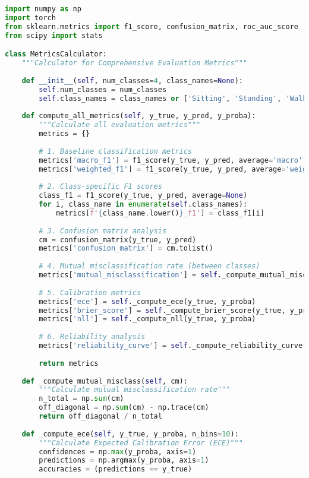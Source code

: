 \begin{lstlisting}[language=Python,caption=Implementation of Comprehensive Evaluation Metrics]
import numpy as np
import torch
from sklearn.metrics import f1_score, confusion_matrix, roc_auc_score
from scipy import stats

class MetricsCalculator:
    """Calculator for Comprehensive Evaluation Metrics"""
    
    def __init__(self, num_classes=4, class_names=None):
        self.num_classes = num_classes
        self.class_names = class_names or ['Sitting', 'Standing', 'Walking', 'Falling']
    
    def compute_all_metrics(self, y_true, y_pred, y_proba):
        """Calculate all evaluation metrics"""
        metrics = {}
        
        # 1. Baseline classification metrics
        metrics['macro_f1'] = f1_score(y_true, y_pred, average='macro')
        metrics['weighted_f1'] = f1_score(y_true, y_pred, average='weighted')
        
        # 2. Class-specific F1 scores
        class_f1 = f1_score(y_true, y_pred, average=None)
        for i, class_name in enumerate(self.class_names):
            metrics[f'{class_name.lower()}_f1'] = class_f1[i]
        
        # 3. Confusion matrix analysis
        cm = confusion_matrix(y_true, y_pred)
        metrics['confusion_matrix'] = cm.tolist()
        
        # 4. Mutual misclassification rate (between classes)
        metrics['mutual_misclassification'] = self._compute_mutual_misclass(cm)
        
        # 5. Calibration metrics
        metrics['ece'] = self._compute_ece(y_true, y_proba)
        metrics['brier_score'] = self._compute_brier_score(y_true, y_proba)
        metrics['nll'] = self._compute_nll(y_true, y_proba)
        
        # 6. Reliability analysis
        metrics['reliability_curve'] = self._compute_reliability_curve(y_true, y_proba)
        
        return metrics
    
    def _compute_mutual_misclass(self, cm):
        """Calculate mutual misclassification rate"""
        n_total = np.sum(cm)
        off_diagonal = np.sum(cm) - np.trace(cm)
        return off_diagonal / n_total
    
    def _compute_ece(self, y_true, y_proba, n_bins=10):
        """Calculate Expected Calibration Error (ECE)"""
        confidences = np.max(y_proba, axis=1)
        predictions = np.argmax(y_proba, axis=1)
        accuracies = (predictions == y_true)
        

\end{lstlisting}
